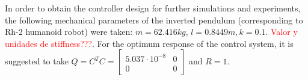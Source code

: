 In order to obtain the controller design for further simulations and experiments, the following mechanical parameters of the inverted pendulum (corresponding to Rh-2 humanoid robot) were taken: $m = 62.416 kg$, $l=0.8449 m, k=0.1$. \textcolor{red}{Valor y unidades de stiffness???}. For the optimum response of the control system, it is suggested to take $Q = C^{T}C = \begin{bmatrix}
5.037 \cdot 10^{-8} & 0\\
0 & 0
\end{bmatrix}$ and $R = 1 $. 











